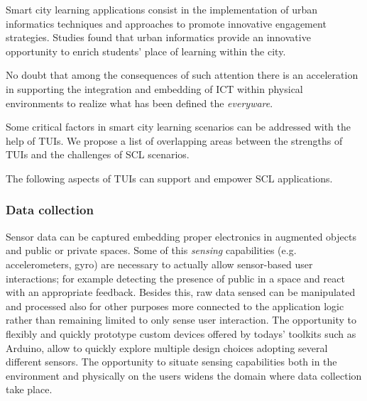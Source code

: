 Smart city learning applications consist in the implementation of urban informatics techniques and approaches to promote innovative engagement strategies\cite{amayocaldwell_urban_2013}.
Studies found that urban informatics provide an innovative opportunity to enrich students' place of learning within the city\cite{amayocaldwell_urban_2013}.

No doubt that among the consequences of such attention there is an acceleration in supporting the integration and embedding of ICT within physical environments to realize what has been defined the \textit{everyware}\cite{giffinger_smart_2007}.


Some critical factors in smart city learning scenarios can be addressed with the help of TUIs. We propose a list of overlapping areas between the strengths of TUIs and the challenges of SCL scenarios.

The following aspects of TUIs can support and empower SCL applications.

\subsubsection{Data collection}
Sensor data can be captured embedding proper electronics in augmented objects and public or private spaces.
Some of this \textit{sensing} capabilities (e.g. accelerometers, gyro) are necessary to actually allow sensor-based user interactions; for example detecting the presence of public in a space and react with an appropriate feedback. Besides this, raw data sensed can be manipulated and processed also for other purposes more connected to the application logic rather than remaining limited to only sense user interaction.
The opportunity to flexibly and quickly prototype custom devices offered by todays' toolkits such as Arduino, allow to quickly explore multiple design choices adopting several different sensors.
The opportunity to situate sensing capabilities both in the environment and physically on the users widens the domain where data collection take place.


